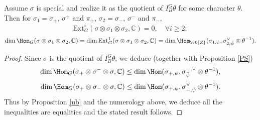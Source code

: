 \documentclass[11pt,reqno]{amsart}
\newcommand{\BC}{{\mathbb {C}}} \newcommand{\BD}{{\mathbb {D}}}
\newcommand{\Ext}{{\mathrm{Ext}}}
\theoremstyle{plain}
\theoremstyle{remark} \newtheorem{remark}[thm]{Remark}
\theoremstyle{definition} \newtheorem{exercise}[thm]{Exercise}
\theoremstyle{definition} \newtheorem{example}[thm]{Example} \newtheorem{condition}[thm]{Condition}
\numberwithin{equation}{section}
\renewcommand{\-}{\text{--}}
\begin{document}
\begin{prop}\label{St} Assume  $\sigma$ is  special and realize it as  the quotient of $I_B^G\theta$ for some character $\theta$. Then for $\sigma_1=\sigma_+$, $\sigma^+$ and $\pi_+$, $\sigma_2=\sigma_-$, $\sigma^-$ and $\pi_-$,
 $$\Ext^i_G(\sigma\otimes \sigma_1\otimes \sigma_2,\BC)=0,\quad \forall i\geq2;$$ 
$$\dim\Hom_G(\sigma\otimes\sigma_1\otimes \sigma_2,\BC)=\dim\Ext^1_G(\sigma\otimes\sigma_1\otimes \sigma_2,\BC)=\dim \Hom_{\wt{Z}}(\sigma_{1,\psi}, \sigma_{2,\bar{\psi}}^\vee\otimes\theta^{-1}).$$
\end{prop}
\begin{proof}Since  $\sigma$ is the quotient of $I_B^G\theta$,  we deduce (together with Proposition \ref{PS})
\[\dim \Hom_G(\sigma_+\otimes \sigma^-\otimes \sigma, \BC)\leq \dim\Hom(\sigma_{+,\psi},\sigma^{-,\vee}_{\bar{\psi}}\otimes\theta^{-1}),\] \[\dim \Hom_G(\sigma_+\otimes \sigma_-\otimes \sigma, \BC)\leq\dim\Hom(\sigma_{+,\psi},\sigma^{\vee}_{-,\bar{\psi}}\otimes\theta^{-1}).\]
Thus by Proposition \ref{ub} and the numerology above, we deduce all the inequalities are equalities and the stated result follows.
\end{proof}
\end{document}
